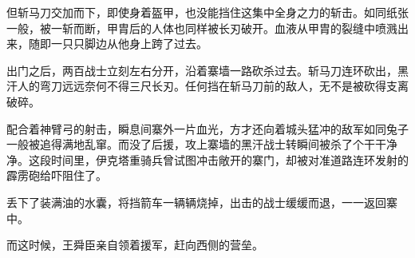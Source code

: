 但斩马刀交加而下，即使身着盔甲，也没能挡住这集中全身之力的斩击。如同纸张一般，被一斩而断，甲胄后的人体也同样被长刃破开。血液从甲胄的裂缝中喷溅出来，随即一只只脚边从他身上跨了过去。

出门之后，两百战士立刻左右分开，沿着寨墙一路砍杀过去。斩马刀连环砍出，黑汗人的弯刀远远奈何不得三尺长刃。任何挡在斩马刀前的敌人，无不是被砍得支离破碎。

配合着神臂弓的射击，瞬息间寨外一片血光，方才还向着城头猛冲的敌军如同兔子一般被追得满地乱窜。而没了后援，攻上寨墙的黑汗战士转瞬间被杀了个干干净净。这段时间里，伊克塔重骑兵曾试图冲击敞开的寨门，却被对准道路连环发射的霹雳砲给吓阻住了。

丢下了装满油的水囊，将挡箭车一辆辆烧掉，出击的战士缓缓而退，一一返回寨中。

而这时候，王舜臣亲自领着援军，赶向西侧的营垒。

